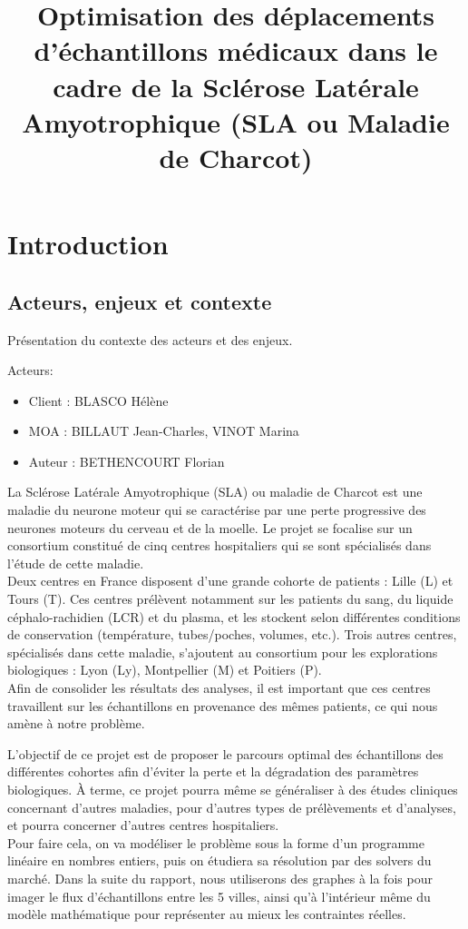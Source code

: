 \documentclass{polytech/polytech}
\title{Optimisation des déplacements d’échantillons médicaux dans le cadre de la Sclérose Latérale Amyotrophique
(SLA ou Maladie de Charcot)}
\numberwithin{figure}{chapter}
\begin{document}
             
\chapter{Introduction}
\section{Acteurs, enjeux et contexte}

Présentation du contexte des acteurs et des enjeux.

Acteurs:
\begin{itemize}
\item Client : BLASCO Hélène
\item MOA : BILLAUT Jean-Charles, VINOT Marina
\item Auteur : BETHENCOURT Florian\\
\end{itemize}

\begin{flushleft}
La Sclérose Latérale Amyotrophique (SLA) ou maladie de Charcot est une maladie du neurone moteur qui se caractérise par une perte progressive des neurones moteurs du cerveau et de la moelle.  Le projet se focalise sur un consortium constitué de cinq centres hospitaliers qui se sont spécialisés dans l’étude de cette maladie.\\
Deux centres en France disposent d’une grande cohorte de patients : Lille (L) et Tours (T). Ces centres prélèvent notamment sur les patients du sang, du liquide céphalo-rachidien (LCR) et du plasma, et les stockent selon différentes conditions de conservation (température, tubes/poches, volumes, etc.). Trois autres centres, spécialisés dans cette maladie, s’ajoutent au consortium pour les explorations biologiques : Lyon (Ly), Montpellier (M) et Poitiers (P).\\
Afin de consolider les résultats des analyses, il est important que ces centres travaillent sur les échantillons en provenance des mêmes patients, ce qui nous amène à notre problème.
\end{flushleft}

\begin{flushleft}
L’objectif de ce projet est de proposer le parcours optimal des échantillons des différentes
cohortes afin d’éviter la perte et la dégradation des paramètres biologiques. À terme, ce projet pourra même
se généraliser à des études cliniques concernant d’autres maladies, pour d’autres types de
prélèvements et d’analyses, et pourra concerner d’autres centres hospitaliers.\\
Pour faire cela, on va modéliser le problème sous la forme d’un programme linéaire en nombres entiers, puis on étudiera sa résolution par des solvers du marché. Dans la suite du rapport, nous utiliserons des graphes à la fois pour imager le flux d'échantillons entre les 5 villes, ainsi qu'à l'intérieur même du modèle mathématique pour représenter au mieux les contraintes réelles.
\end{flushleft}
\end{document}
